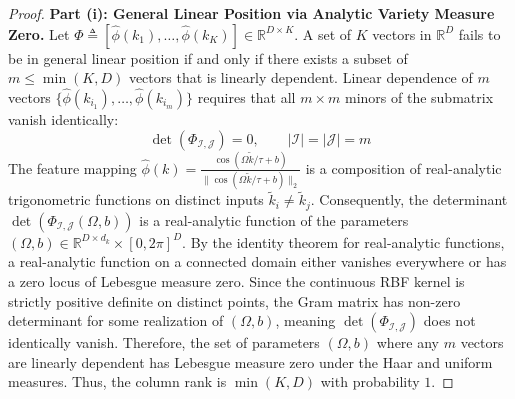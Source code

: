 \begin{proof}
\textbf{Part (i): General Linear Position via Analytic Variety Measure Zero.}
Let $\Phi \triangleq [\hat{\phi}(k_1), \dots, \hat{\phi}(k_K)] \in \mathbb{R}^{D \times K}$. A set of $K$ vectors in $\mathbb{R}^D$ fails to be in general linear position if and only if there exists a subset of $m \le \min(K, D)$ vectors that is linearly dependent. Linear dependence of $m$ vectors $\{\hat{\phi}(k_{i_1}), \dots, \hat{\phi}(k_{i_m})\}$ requires that all $m \times m$ minors of the submatrix vanish identically:
\begin{equation}
\det\left( \Phi_{\mathcal{I}, \mathcal{J}} \right) = 0, \qquad |\mathcal{I}| = |\mathcal{J}| = m
\label{eq:minor_det}
\end{equation}
The feature mapping $\hat{\phi}(k) = \frac{\cos(\Omega \tilde{k} / \tau + b)}{\|\cos(\Omega \tilde{k} / \tau + b)\|_2}$ is a composition of real-analytic trigonometric functions on distinct inputs $\tilde{k}_i \neq \tilde{k}_j$. Consequently, the determinant $\det(\Phi_{\mathcal{I}, \mathcal{J}}(\Omega, b))$ is a real-analytic function of the parameters $(\Omega, b) \in \mathbb{R}^{D \times d_k} \times [0, 2\pi]^D$. By the identity theorem for real-analytic functions, a real-analytic function on a connected domain either vanishes everywhere or has a zero locus of Lebesgue measure zero. Since the continuous RBF kernel is strictly positive definite on distinct points, the Gram matrix has non-zero determinant for some realization of $(\Omega, b)$, meaning $\det(\Phi_{\mathcal{I}, \mathcal{J}})$ does not identically vanish. Therefore, the set of parameters $(\Omega, b)$ where any $m$ vectors are linearly dependent has Lebesgue measure zero under the Haar and uniform measures. Thus, the column rank is $\min(K, D)$ with probability $1$.


\end{proof}
